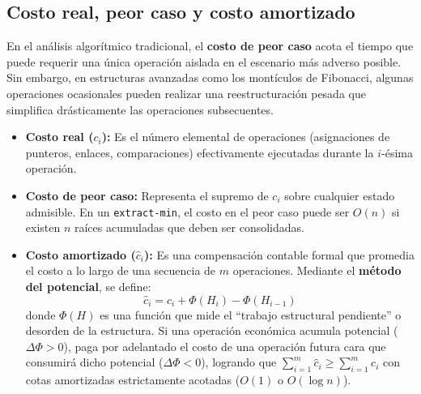 \subsection{Costo real, peor caso y costo amortizado}
En el análisis algorítmico tradicional, el \textbf{costo de peor caso} acota el tiempo que puede requerir una única operación aislada en el escenario más adverso posible. Sin embargo, en estructuras avanzadas como los montículos de Fibonacci, algunas operaciones ocasionales pueden realizar una reestructuración pesada que simplifica drásticamente las operaciones subsecuentes.
\begin{itemize}
    \item \textbf{Costo real ($c_i$):} Es el número elemental de operaciones (asignaciones de punteros, enlaces, comparaciones) efectivamente ejecutadas durante la $i$-ésima operación.
    \item \textbf{Costo de peor caso:} Representa el supremo de $c_i$ sobre cualquier estado admisible. En un \texttt{extract-min}, el costo en el peor caso puede ser $O(n)$ si existen $n$ raíces acumuladas que deben ser consolidadas.
    \item \textbf{Costo amortizado ($\hat{c}_i$):} Es una compensación contable formal que promedia el costo a lo largo de una secuencia de $m$ operaciones. Mediante el \textbf{método del potencial}, se define:
    \begin{equation}
        \hat{c}_i = c_i + \Phi(H_i) - \Phi(H_{i-1})
    \end{equation}
    donde $\Phi(H)$ es una función que mide el ``trabajo estructural pendiente'' o desorden de la estructura. Si una operación económica acumula potencial ($\Delta \Phi > 0$), paga por adelantado el costo de una operación futura cara que consumirá dicho potencial ($\Delta \Phi < 0$), logrando que $\sum_{i=1}^m \hat{c}_i \ge \sum_{i=1}^m c_i$ con cotas amortizadas estrictamente acotadas ($O(1)$ o $O(\log n)$).
\end{itemize}

